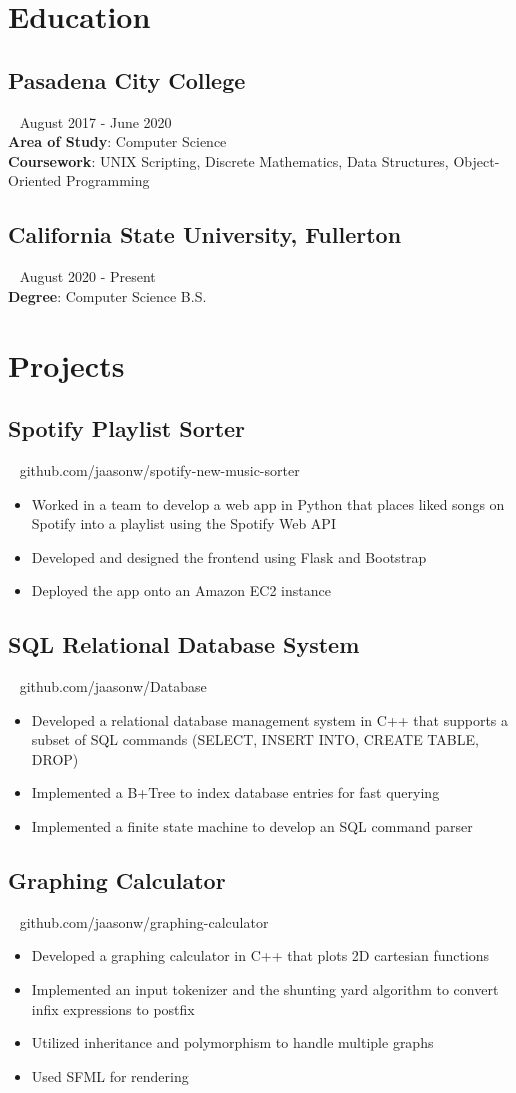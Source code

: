 \documentclass{article}
\newcommand{\resumesection}[3]{
    \subsection*{#1}
    \ 
    \footnotesize
    \textcolor{wordgrey}{#2}
    \normalsize
    \hfill
    \textcolor{wordgrey}{#3}
}
\begin{document}
\pagestyle{useheader}

\section*{Education}
\resumesection{Pasadena City College}{}{August 2017 - June 2020}\\
\textbf{Area of Study}: Computer Science\\
\textbf{Coursework}: UNIX Scripting, Discrete Mathematics, Data Structures, Object-Oriented Programming
\\
\resumesection{California State University, Fullerton}{}{August 2020 - Present}\\
\textbf{Degree}: Computer Science B.S.\\
\section*{Projects}
\resumesection{Spotify Playlist Sorter}{}{github.com/jaasonw/spotify-new-music-sorter}
\begin{itemize}
    \item Worked in a team to develop a web app in Python that places liked songs on Spotify into a playlist using the Spotify Web API
    \item Developed and designed the frontend using Flask and Bootstrap
    \item Deployed the app onto an Amazon EC2 instance
\end{itemize}

\resumesection{SQL Relational Database System}{}{github.com/jaasonw/Database}
\begin{itemize}
    \item Developed a relational database management system in C++ that supports a subset of SQL commands (SELECT, INSERT INTO, CREATE TABLE, DROP) 
    \item Implemented a B+Tree to index database entries for fast querying
    \item Implemented a finite state machine to develop an SQL command parser
\end{itemize}

\resumesection{Graphing Calculator}{}{github.com/jaasonw/graphing-calculator}
\begin{itemize}
    \item Developed a graphing calculator in C++ that plots 2D cartesian functions
    \item Implemented an input tokenizer and the shunting yard algorithm to convert infix expressions to postfix
    \item Utilized inheritance and polymorphism to handle multiple graphs
    \item Used SFML for rendering
\end{itemize}
\end{document}
